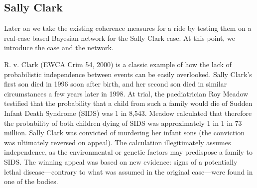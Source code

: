 \documentclass[10pt,]{scrartcl}
\newcommand{\s}[1]{\mbox{\textsf{#1}}}
\begin{document}










\subsection{Sally Clark}

Later on we take the existing coherence measures for a ride by testing them on a real-case based Bayesian network for the Sally Clark case. At this point, we introduce the case and the network.

 R. v. Clark (EWCA Crim 54, 2000) is a classic  example of how the lack of probabilistic independence between events can be easily overlooked. Sally Clark's first son died in 1996 soon after birth, and her second son died in similar circumstances a few years later in 1998.  At trial, the paediatrician Roy Meadow testified that the probability that a child from such a  family would die of Sudden Infant Death Syndrome (SIDS) was 1 in 8,543.  Meadow calculated that therefore the probability of both children dying of SIDS was approximately 1 in  1 in 73 million. Sally Clark was convicted of murdering her  infant sons (the conviction was ultimately reversed on appeal). The calculation illegitimately assumes independence,  as the  environmental or genetic factors may predispose a family to SIDS. The winning appeal was based on new evidence: signs of a potentially lethal disease---contrary to what was assumed in the original case---were found in one of the bodies. 
\end{document}
